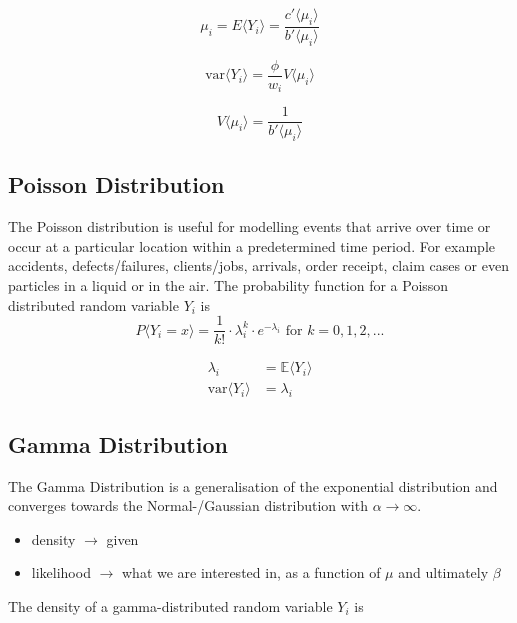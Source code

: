 \documentclass[11pt]{article}
\begin{document}
\begin{equation*}
	\mu_i = E\langle Y_i \rangle = \frac{c'\langle\mu_i \rangle}{b' \langle\mu_i\rangle}
\end{equation*}

\begin{equation*}
	\text{var} \langle Y_i \rangle = \frac{\phi}{w_i} V\langle \mu_i\rangle
\end{equation*}

\begin{equation*}
	V\langle \mu_i\rangle = \frac{1}{b'\langle\mu_i\rangle}
\end{equation*}

\subsection{Poisson Distribution}
The Poisson distribution is useful for modelling events that arrive over time or occur at a particular location within a predetermined time period. For example accidents, defects/failures, clients/jobs, arrivals, order receipt, claim cases or even particles in a liquid or in the air. The probability function for a Poisson distributed random variable $Y_i$ is
\begin{equation*}
	P\langle Y_i = x \rangle = \frac{1}{k!}\cdot \lambda_i^k\cdot e^{-\lambda_i}\text{ for } k=0,1,2,...
\end{equation*}

\begin{align*}
	\lambda_i &= \mathbb{E}\langle Y_i \rangle\\
	\text{var}\langle Y_i\rangle &= \lambda_i
\end{align*}

\subsection{Gamma Distribution}
The Gamma Distribution is a generalisation of the exponential distribution and converges towards the Normal-/Gaussian distribution with $\alpha\rightarrow\infty$.

\begin{itemize}
	\item density $\rightarrow$ given
	\item likelihood $\rightarrow$ what we are interested in, as a function of $\mu$ and ultimately $\beta$
\end{itemize}

The density of a gamma-distributed random variable $Y_i$ is
\end{document}
